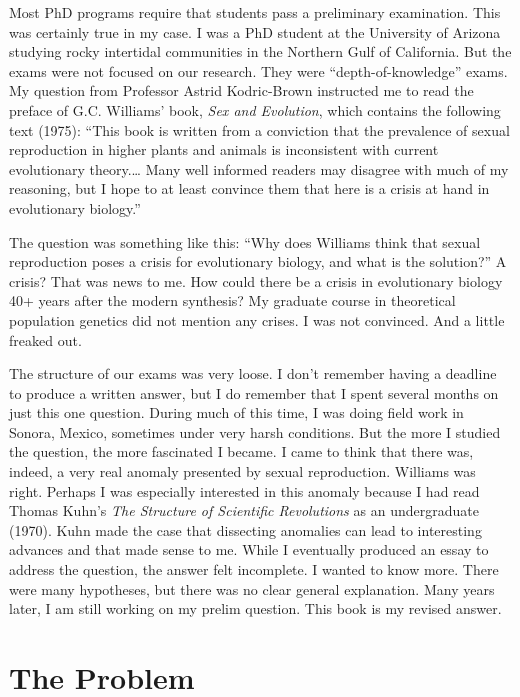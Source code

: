 \documentclass[
  letterpaper,
]{book}
\begin{document}
Most PhD programs require that students pass a preliminary examination.
This was certainly true in my case. I was a PhD student at the
University of Arizona studying rocky intertidal communities in the
Northern Gulf of California. But the exams were not focused on our
research. They were ``depth-of-knowledge'' exams. My question from
Professor Astrid Kodric-Brown instructed me to read the preface of G.C.
Williams' book, \emph{Sex and Evolution}, which contains the following
text (1975): ``This book is written from a conviction that the
prevalence of sexual reproduction in higher plants and animals is
inconsistent with current evolutionary theory.\ldots{} Many well
informed readers may disagree with much of my reasoning, but I hope to
at least convince them that here is a crisis at hand in evolutionary
biology.''

The question was something like this: ``Why does Williams think that
sexual reproduction poses a crisis for evolutionary biology, and what is
the solution?'' A crisis? That was news to me. How could there be a
crisis in evolutionary biology 40+ years after the modern synthesis? My
graduate course in theoretical population genetics did not mention any
crises. I was not convinced. And a little freaked out.

The structure of our exams was very loose. I don't remember having a
deadline to produce a written answer, but I do remember that I spent
several months on just this one question. During much of this time, I
was doing field work in Sonora, Mexico, sometimes under very harsh
conditions. But the more I studied the question, the more fascinated I
became. I came to think that there was, indeed, a very real anomaly
presented by sexual reproduction. Williams was right. Perhaps I was
especially interested in this anomaly because I had read Thomas Kuhn's
\emph{The Structure of Scientific Revolutions} as an undergraduate
(1970). Kuhn made the case that dissecting anomalies can lead to
interesting advances and that made sense to me. While I eventually
produced an essay to address the question, the answer felt incomplete. I
wanted to know more. There were many hypotheses, but there was no clear
general explanation. Many years later, I am still working on my prelim
question. This book is my revised answer.

\section{The Problem}\label{the-problem}
\end{document}
